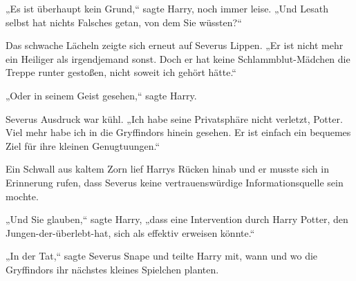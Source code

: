 „Es ist überhaupt kein Grund,“ sagte Harry, noch immer leise. „Und Lesath selbst hat nichts Falsches getan, von dem Sie wüssten?“

Das schwache Lächeln zeigte sich erneut auf Severus Lippen. „Er ist nicht mehr ein Heiliger als irgendjemand sonst. Doch er hat keine Schlammblut-Mädchen die Treppe runter gestoßen, nicht soweit ich gehört hätte.“

„Oder in seinem Geist gesehen,“ sagte Harry.

Severus Ausdruck war kühl. „Ich habe seine Privatsphäre nicht verletzt, Potter. Viel mehr habe ich in die Gryffindors hinein gesehen. Er ist einfach ein bequemes Ziel für ihre kleinen Genugtuungen.“

Ein Schwall aus kaltem Zorn lief Harrys Rücken hinab und er musste sich in Erinnerung rufen, dass Severus keine vertrauenswürdige Informationsquelle sein mochte.

„Und Sie glauben,“ sagte Harry, „dass eine Intervention durch Harry Potter, den Jungen-der-überlebt-hat, sich als effektiv erweisen könnte.“

„In der Tat,“ sagte Severus Snape und teilte Harry mit, wann und wo die Gryffindors ihr nächstes kleines Spielchen planten.

\later

